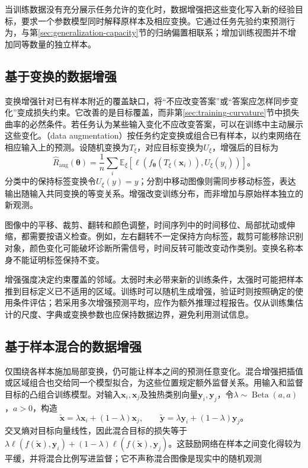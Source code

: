 当训练数据没有充分展示任务允许的变化时，数据增强把这些变化写入新的经验目标，要求一个参数模型同时解释原样本及相应变换。它通过任务先验约束预测行为，与第\ref{sec:generalization-capacity}节的归纳偏置相联系；增加训练视图并不增加同等数量的独立样本。

\subsection{基于变换的数据增强}
\label{sec:generalization-transform-augmentation}

变换增强针对已有样本附近的覆盖缺口，将“不应改变答案”或“答案应怎样同步变化”变成损失约束。它改善的是目标覆盖，而非第\ref{sec:training-curvature}节中损失曲率的必然条件。若任务认为某些输入变化不应改变答案，可以在训练中主动展示这些变化。（data augmentation）按任务约定变换或组合已有样本，以约束网络在相应输入上的预测。设随机变换为$T_{\xi}$，对应目标变换为$U_{\xi}$，增强后的目标为
\begin{equation}
  \hat R_{\mathrm{aug}}(\bm\theta)
  =\frac1n\sum_i\mathbb E_{\xi}
    [\ell(f_{\bm\theta}(T_{\xi}(\bm x_i)),U_{\xi}(y_i))]\text{。}
  \label{eq:generalization-augmentation-risk}
\end{equation}
分类中的保持标签变换令$U_{\xi}(y)=y$；分割中移动图像则需同步移动标签，表达输出随输入共同变换的等变关系。增强改变训练分布，而非增加与原始样本独立的新观测。

图像中的平移、裁剪、翻转和颜色调整，时间序列中的时间移位、局部扰动或伸缩，都需要按语义检查。例如，左右翻转不一定保持方向标签，裁剪可能移除识别对象，颜色变化可能破坏诊断所需信号，时间反转可能改变动作类别。变换名称本身不能证明标签保持不变。

增强强度决定约束覆盖的邻域。太弱时未必带来新的训练条件，太强时可能把样本推到目标定义已不适用的区域。训练时可以随机生成增强，验证时则按照确定的使用条件评估；若采用多次增强预测平均，应作为额外推理过程报告。仅从训练集估计的尺度、字典或变换参数也应保持数据边界，避免利用测试信息。

\subsection{基于样本混合的数据增强}
\label{sec:generalization-sample-mixing}

仅围绕各样本施加局部变换，仍可能让样本之间的预测任意变化。混合增强把插值或区域组合也交给同一个模型拟合，为这些位置规定额外监督关系。用输入和监督目标的凸组合训练模型。对输入$\bm x_i,\bm x_j$及独热类别向量$\bm y_i,\bm y_j$，令$\lambda\sim\operatorname{Beta}(a,a)$，$a>0$，构造
\begin{equation}
  \tilde{\bm x}=\lambda\bm x_i+(1-\lambda)\bm x_j,\qquad
  \tilde{\bm y}=\lambda\bm y_i+(1-\lambda)\bm y_j\text{。}
  \label{eq:generalization-mixup}
\end{equation}
交叉熵对目标向量线性，因此混合目标的损失等于$\lambda\ell(f(\tilde{\bm x}),\bm y_i)+(1-\lambda)\ell(f(\tilde{\bm x}),\bm y_j)$。这鼓励网络在样本之间变化得较为平缓，并将混合比例写进监督；它不声称混合图像是现实中的随机观测

